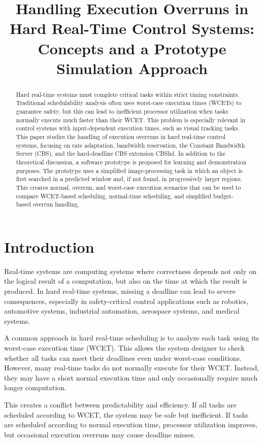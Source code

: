 \documentclass[conference]{IEEEtran}
\title{Handling Execution Overruns in Hard Real-Time Control Systems: Concepts and a Prototype Simulation Approach}
\author{
\IEEEauthorblockN{Christian Percival}
\IEEEauthorblockA{
Electronic Engineering\\
Hochschule Hamm-Lippstadt\\
Lippstadt, Germany
}
}
\begin{document}
\maketitle

\begin{abstract}
Hard real-time systems must complete critical tasks within strict timing constraints. Traditional schedulability analysis often uses worst-case execution times (WCETs) to guarantee safety, but this can lead to inefficient processor utilization when tasks normally execute much faster than their WCET. This problem is especially relevant in control systems with input-dependent execution times, such as visual tracking tasks. This paper studies the handling of execution overruns in hard real-time control systems, focusing on rate adaptation, bandwidth reservation, the Constant Bandwidth Server (CBS), and the hard-deadline CBS extension CBShd. In addition to the theoretical discussion, a software prototype is proposed for learning and demonstration purposes. The prototype uses a simplified image-processing task in which an object is first searched in a predicted window and, if not found, in progressively larger regions. This creates normal, overrun, and worst-case execution scenarios that can be used to compare WCET-based scheduling, normal-time scheduling, and simplified budget-based overrun handling.
\end{abstract}

\section{Introduction}

Real-time systems are computing systems where correctness depends not only on the logical result of a computation, but also on the time at which the result is produced. In hard real-time systems, missing a deadline can lead to severe consequences, especially in safety-critical control applications such as robotics, automotive systems, industrial automation, aerospace systems, and medical systems.

A common approach in hard real-time scheduling is to analyze each task using its worst-case execution time (WCET). This allows the system designer to check whether all tasks can meet their deadlines even under worst-case conditions. However, many real-time tasks do not normally execute for their WCET. Instead, they may have a short normal execution time and only occasionally require much longer computation.

This creates a conflict between predictability and efficiency. If all tasks are scheduled according to WCET, the system may be safe but inefficient. If tasks are scheduled according to normal execution time, processor utilization improves, but occasional execution overruns may cause deadline misses.
\end{document}

